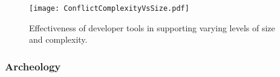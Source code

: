 \begin{figure}[!t]
\centering
\texttt{[image: ConflictComplexityVsSize.pdf]}
\caption{Effectiveness of developer tools in supporting varying levels of size and complexity.}
\label{size_vs_complexity}
\end{figure}

\subsubsection{Archeology}





